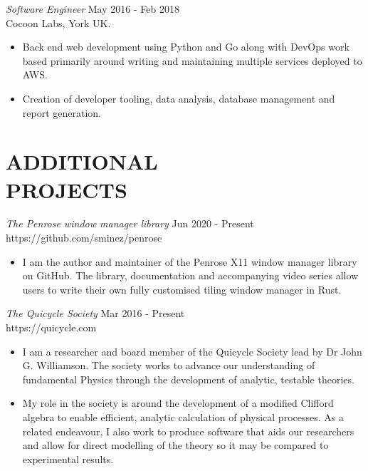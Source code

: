 \documentclass[margin]{res}
\begin{document}
\begin{resume}
{\sl Software Engineer} \hfill May 2016 - Feb 2018 \\
Cocoon Labs, York UK.
\begin{itemize}  \itemsep -2pt %
  \item Back end web development using Python and Go along with DevOps work based
        primarily around writing and maintaining multiple services deployed to AWS.
  \item Creation of developer tooling, data analysis, database management and
        report generation.
\end{itemize}



\section{ADDITIONAL \\ PROJECTS}             
{\sl The Penrose window manager library} \hfill Jun 2020 - Present \\
https://github.com/sminez/penrose
\begin{itemize}  \itemsep -2pt %
  \item I am the author and maintainer of the Penrose X11 window
        manager library on GitHub. The library, documentation and accompanying
        video series allow users to write their own fully customised tiling
        window manager in Rust.
\end{itemize}

{\sl The Quicycle Society} \hfill Mar 2016 - Present \\
https://quicycle.com
\begin{itemize}  \itemsep -2pt %
  \item I am a researcher and board member of the Quicycle Society lead by
        Dr John G. Williamson. The society works to advance our understanding
        of fundamental Physics through the development of analytic, testable
        theories.
  \item My role in the society is around the development of a modified Clifford
        algebra to enable efficient, analytic calculation of physical processes.
        As a related endeavour, I also work to produce software that aids our
        researchers and allow for direct modelling of the theory so it may be
        compared to experimental results.
\end{itemize}

\end{resume}
\end{document}
